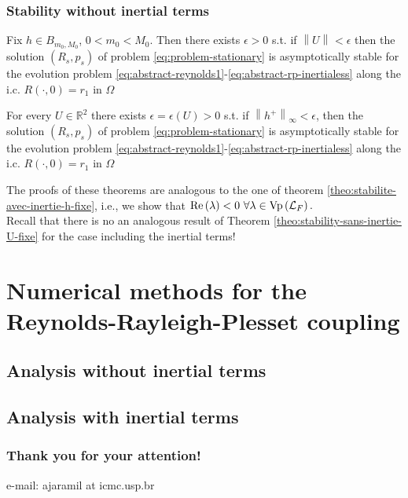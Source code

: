 \documentclass[10pt,aspectratio=169]{beamer}
\newcommand{\norm}[2]{\left\lVert#1\right\rVert_{#2}}
\newcommand{\Vp}[1]{\textnormal{Vp}\left(#1\right)}
\begin{document}

\begin{frame}\frametitle{Stability without inertial terms}
\begin{theorem} \label{theo:stability-sans-inertie-h-fix}
	Fix $h\in B_{m_0,M_0}$, $0<m_0<M_0$. Then there exists $\epsilon>0$ s.t. if $\norm{U}{}<\epsilon$ then the solution $\left(R_s,p_s\right)$ of problem \eqref{eq:problem-stationary} is asymptotically stable for the evolution problem \eqref{eq:abstract-reynolds1}-\eqref{eq:abstract-rp-inertialess} along the i.c. $R\left(\cdot,0\right)=r_1$ in $\Omega$
\end{theorem}
\begin{theorem}\label{theo:stability-sans-inertie-U-fixe} For every $U\in \mathbb{R}^2$ there exists $\epsilon=\epsilon\left(U\right)>0$ s.t. if $\norm{h^+}{\infty}<\epsilon$, then the solution $\left(R_s,p_s\right)$ of problem \eqref{eq:problem-stationary} is asymptotically stable for the evolution problem \eqref{eq:abstract-reynolds1}-\eqref{eq:abstract-rp-inertialess} along the i.c. $R\left(\cdot,0\right)=r_1$ in $\Omega$
\end{theorem}

The proofs of these theorems are analogous to the one of theorem \ref{theo:stabilite-avec-inertie-h-fixe}, i.e., we show that $\mbox{Re}\left(\lambda\right)<0~\forall \lambda\in \Vp{\mathcal{L}_F}.$\\
\bigskip
Recall that there is no an analogous result of Theorem \ref{theo:stability-sans-inertie-U-fixe} for the case including the inertial terms!
\end{frame}


\section{Numerical methods for the Reynolds-Rayleigh-Plesset coupling}
\subsection{Analysis without inertial terms}
\begin{frame}
\tableofcontents[
currentsection,
currentsubsection,
subsectionstyle=show/shaded/hide
]
\end{frame}
\subsection{Analysis with inertial terms}
\begin{frame}
\tableofcontents[
currentsection,
currentsubsection,
subsectionstyle=show/shaded/hide
]
\end{frame}

\begin{frame}\frametitle{Thank you for your attention!}\centering
\begin{center}
e-mail: ajaramil at icmc.usp.br
\end{center}

\end{frame}
\end{document}
